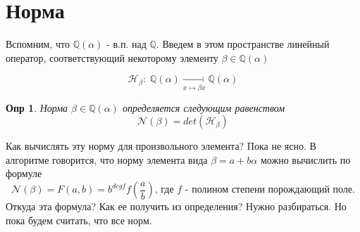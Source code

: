 \documentclass[oneside,final,14pt]{extreport}
\theoremstyle{plain}
\begin{document}
\section{Норма}


Вспомним, что $\mathbb{Q}(\alpha)$ - в.п. над $\mathbb{Q}$. Введем в этом пространстве линейный оператор, соответствующий некоторому элементу $\beta \in \mathbb{Q}(\alpha)$

\[
\mathcal{H}_{\beta}: \;\mathbb{Q}(\alpha) \xrightarrow[x \mapsto \beta x]{} \mathbb{Q}(\alpha)
\]

\newtheorem*{def*}{Опр}
\begin{def*}
Норма $\beta \in \mathbb{Q}(\alpha) $ определяется следующим равенством
$$\mathcal{N}(\beta)=det(\mathcal{H}_{\beta})$$
\end{def*}


Как вычислять эту норму для произвольного элемента? Пока не ясно. В алгоритме говорится, что норму элемента вида $\beta=a+b \alpha$ можно вычислить по формуле
$$
\mathcal{N}(\beta)=F(a,b) = b^{degf}f(\frac{a}{b}) \text{, где } f \text{ - полином степени порождающий поле.}
$$ 
Откуда эта формула? Как ее получить из определения? Нужно разбираться. Но пока будем считать, что все норм.
\end{document}
